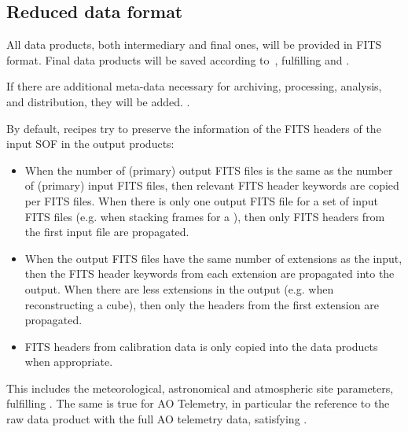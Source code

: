 %



\subsection{Reduced data format}
\label{ssec:reduced_data_format}

All data products, both intermediary and final ones, will be provided in FITS format. Final data products will be saved according to~\cite{ESO-products_standard}, fulfilling  and .

If there are additional meta-data necessary for archiving, processing, analysis, and distribution, they will be added. .

By default, recipes try to preserve the information of the FITS headers of the input \ac{SOF} in the output products:
\begin{itemize}
\item When the number of (primary) output FITS files is the same as the number of (primary) input FITS files, then relevant FITS header keywords are copied per FITS files. When there is only one output FITS file for a set of input FITS files (e.g. when stacking frames for a \hyperref[dataitem:master_dark_2rg]{}), then only FITS headers from the first input file are propagated.
\item When the output FITS files have the same number of extensions as  the input, then the FITS header keywords from each extension are propagated into the output. When there are less extensions in the output (e.g. when reconstructing a cube), then only the headers from the first extension are propagated.
\item FITS headers from calibration data is only copied into the data products when appropriate.
\end{itemize}
This includes the meteorological, astronomical and atmospheric site parameters, fulfilling .
The same is true for \ac{AO} Telemetry, in particular the reference to the raw data product with the full \ac{AO} telemetry data, satisfying .

